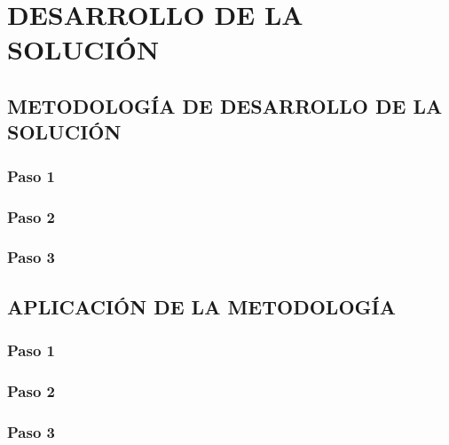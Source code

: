 \chapter{DESARROLLO DE LA SOLUCIÓN}

\section{METODOLOGÍA DE DESARROLLO DE LA SOLUCIÓN}

\lipsum[1]

\subsection{Paso 1}

\lipsum[2]

\subsection{Paso 2}

\lipsum[3]

\subsection{Paso 3}

\lipsum[4]

\section{APLICACIÓN DE LA METODOLOGÍA}

\lipsum[5]

\subsection{Paso 1}

\lipsum[6]

\subsection{Paso 2}

\lipsum[7]

\subsection{Paso 3}

\lipsum[8]